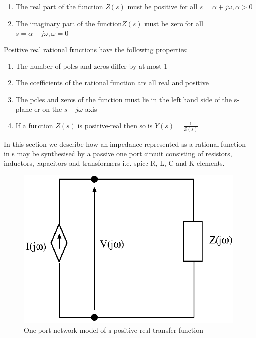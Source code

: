 \begin{enumerate}
\item The real part of the function $Z(s)$ must be positive for all $s=\alpha+j\omega, \alpha>0$
\item The imaginary part of the function$Z(s)$ must be zero for all $s=\alpha+j\omega, \omega=0$
\end{enumerate}

Positive real rational functions have the following properties:

\begin{enumerate}
\item The number of poles and zeros differ by at most 1
\item The coefficients of the rational function are all real and positive
\item The poles and zeros of the function must lie in the left hand side of the s-plane or on the $s-j\omega$ axis
\item If a function $Z(s)$ is positive-real then so is $Y(s)=\frac{1}{Z(s)}$
\end{enumerate}

In this section we describe how an impedance represented as a rational function in s may be synthesised by a passive one port circuit consisting of resistors, inductors, capacitors and transformers i.e. spice R, L, C and K elements.
%
\begin{figure}[ht]
\centering
\includegraphics[scale=0.7]{./Imgs/one_port_network.eps}
\caption{One port network model of a positive-real transfer function}
\label{fig:one_port_network}
\end{figure}

